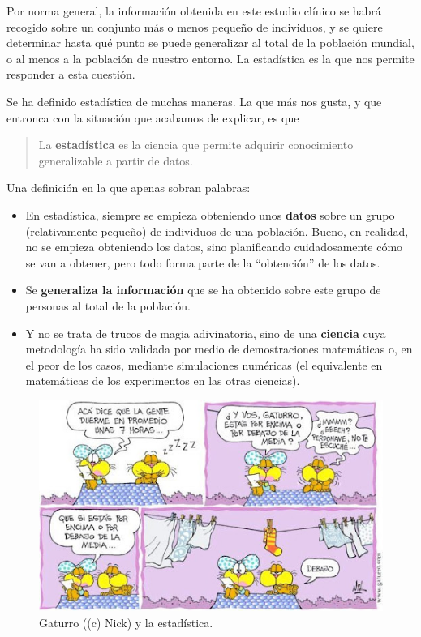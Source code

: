 \documentclass[
]{book}
\providecommand{\tightlist}{%
  \setlength{\itemsep}{0pt}\setlength{\parskip}{0pt}}
\theoremstyle{definition}
\theoremstyle{definition}
\theoremstyle{definition}
\theoremstyle{definition}
\theoremstyle{remark}
\begin{document}
Por norma general, la información obtenida en este estudio clínico se habrá recogido sobre un conjunto más o menos pequeño de individuos, y se quiere determinar hasta qué punto se puede generalizar al total de la población mundial, o al menos a la población de nuestro entorno. La estadística es la que nos permite responder a esta cuestión.

Se ha definido estadística de muchas maneras. La que más nos gusta, y que entronca con la situación que acabamos de explicar, es que

\begin{quote}
La \textbf{estadística} es la ciencia que permite adquirir conocimiento generalizable a partir de datos.
\end{quote}

Una definición en la que apenas sobran palabras:

\begin{itemize}
\tightlist
\item
  En estadística, siempre se empieza obteniendo unos \textbf{datos} sobre un grupo (relativamente pequeño) de individuos de una población. Bueno, en realidad, no se empieza obteniendo los datos, sino planificando cuidadosamente cómo se van a obtener, pero todo forma parte de la ``obtención'' de los datos.
\item
  Se \textbf{generaliza la información} que se ha obtenido sobre este grupo de personas al total de la población.
\item
  Y no se trata de trucos de magia adivinatoria, sino de una \textbf{ciencia} cuya metodología ha sido validada por medio de demostraciones matemáticas o, en el peor de los casos, mediante simulaciones numéricas (el equivalente en matemáticas de los experimentos en las otras ciencias).
\end{itemize}

\begin{figure}

{\centering \includegraphics[width=0.8\linewidth]{INREMDN_files/figure-html/gaturro} 

}

\caption{Gaturro ((c) Nick) y la estadística.}\label{fig:gaturro}
\end{figure}
\end{document}
